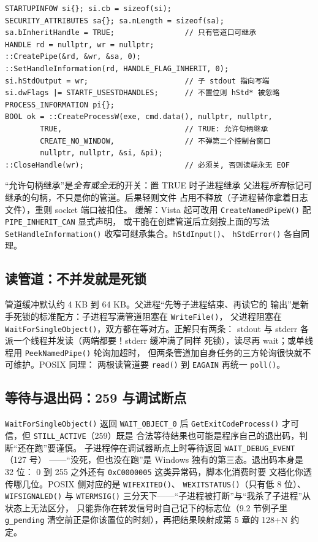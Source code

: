 \documentclass[12pt,a4paper,fontset=fandol]{ctexbook}
\newcommand{\Fn}[1]{\texttt{#1()}}
\newcommand{\Tp}[1]{\texttt{#1}}
\newcommand{\Bk}{\allowbreak}
\begin{document}
\begin{lstlisting}[caption={CreateProcessW 重定向 stdout（spawn\_win.cpp 核心）}]
STARTUPINFOW si{}; si.cb = sizeof(si);
SECURITY_ATTRIBUTES sa{}; sa.nLength = sizeof(sa);
sa.bInheritHandle = TRUE;                // 只有管道口可继承
HANDLE rd = nullptr, wr = nullptr;
::CreatePipe(&rd, &wr, &sa, 0);
::SetHandleInformation(rd, HANDLE_FLAG_INHERIT, 0);
si.hStdOutput = wr;                      // 子 stdout 指向写端
si.dwFlags |= STARTF_USESTDHANDLES;      // 不置位则 hStd* 被忽略
PROCESS_INFORMATION pi{};
BOOL ok = ::CreateProcessW(exe, cmd.data(), nullptr, nullptr,
        TRUE,                            // TRUE: 允许句柄继承
        CREATE_NO_WINDOW,                // 不弹第二个控制台窗口
        nullptr, nullptr, &si, &pi);
::CloseHandle(wr);                       // 必须关, 否则读端永无 EOF
\end{lstlisting}

\begin{warning}[title={bInheritHandles=TRUE 的泄漏面}]
``允许句柄继承''是\emph{全有或全无}的开关：置 TRUE 时子进程继承
父进程\emph{所有}标记可继承的句柄，不只是你的管道。后果轻则文件
占用不释放（子进程替你拿着日志文件），重则 socket 端口被扣住。
缓解：Vista 起可改用 \Fn{CreateNamedPipeW} 配
\Tp{PIPE\Bk\_INHERIT\Bk\_CAN} 显式声明，
或干脆在创建管道后立刻按上面的写法
\Fn{SetHandleInformation} 收窄可继承集合。\Fn{hStdInput}、
\Fn{hStdError} 各自同理。
\end{warning}

\subsection{读管道：不并发就是死锁}

管道缓冲默认约 4 KB 到 64 KB。父进程``先等子进程结束、再读它的
输出''是新手死锁的标准配方：子进程写满管道阻塞在 \Fn{WriteFile}，
父进程阻塞在 \Fn{WaitForSingleObject}，双方都在等对方。正解只有两条：
stdout 与 stderr 各派一个线程并发读（两端都要！stderr 缓冲满了同样
死锁），读尽再 wait；或单线程用 \Fn{PeekNamedPipe} 轮询加超时，
但两条管道加自身任务的三方轮询很快就不可维护。POSIX 同理：
两根读管道要 \Fn{read} 到 \Tp{EAGAIN} 再统一 \Fn{poll}。

\subsection{等待与退出码：259 与调试断点}

\Fn{WaitForSingleObject} 返回 \Tp{WAIT\_OBJECT\_0} 后
\Fn{GetExitCodeProcess} 才可信，但 \Tp{STILL\_ACTIVE}（259）既是
合法等待结果也可能是程序自己的退出码，判断``还在跑''要谨慎。
子进程停在调试器断点上时等待返回 \Tp{WAIT\_DEBUG\_EVENT}（127 号）
——``没死，但也没在跑''是 Windows 独有的第三态。退出码本身是 32 位：
0 到 255 之外还有 \Tp{0xC0000005} 这类异常码，脚本化消费时要
文档化你透传哪几位。POSIX 侧对应的是 \Fn{WIFEXITED}、
\Fn{WEXITSTATUS}（只有低 8 位）、\Fn{WIFSIGNALED} 与 \Fn{WTERMSIG}
三分天下——``子进程被打断''与``我杀了子进程''从状态上无法区分，
只能靠你在转发信号时自己记下的标志位（9.2 节例子里 \Tp{g\_pending}
清空前正是你该置位的时刻），再把结果映射成第 5 章的 128+N 约定。
\end{document}
